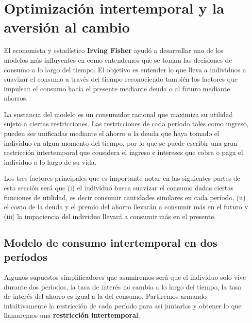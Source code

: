 \section{Optimización intertemporal y la aversión al cambio}

El economista y estadístico \textbf{Irving Fisher} ayudó a desarrollar uno de los modelos más influyentes en como entendemos que se toman las decisiones de consumo a lo largo del tiempo. El objetivo es entender lo que lleva a individuos a suavizar el consumo a través del tiempo reconociendo también los factores que impulsan el consumo hacía el presente mediante deuda o al futuro mediante ahorros.

La sustancia del modelo es un consumidor racional que maximiza su utilidad sujeto a ciertas restricciones. Las restricciones de cada período tales como ingreso, pueden ser unificadas mediante el ahorro o la deuda que haya tomado el individuo en algun momento del tiempo, por lo que se puede escribir una gran restricción intertemporal que considera el ingreso e intereses que cobra o paga el individuo a lo largo de su vida. 

Los tres factores principales que es importante notar en las siguientes partes de esta sección será que (i) el individuo busca suavizar el consumo dadas ciertas funciones de utilidad, es decir consumir cantidades similares en cada período, (ii) el costo de la deuda y el premio del ahorro llevarán a consumir más en el futuro y (iii) la impaciencia del individuo llevará a consumir más en el presente.

\subsection{Modelo de consumo intertemporal en dos períodos}

Algunos supuestos simplificadores que asumiremos será que el individuo solo vive durante dos períodos, la tasa de interés no cambia a lo largo del tiempo, la tasa de interés del ahorro es igual a la del consumo. Partiremos armando intuitivamente la restricción de cada período para así juntarlas y obtener lo que llamaremos una \textbf{restricción intertemporal}. 

